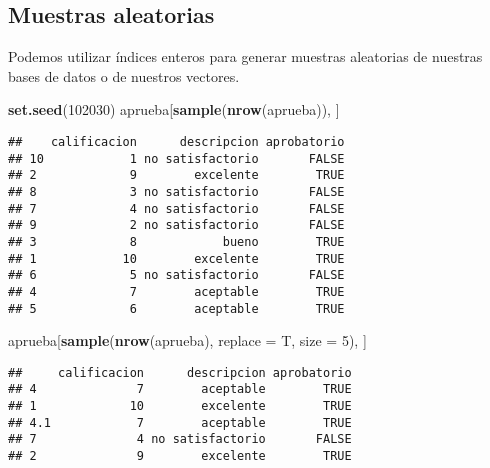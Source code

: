\documentclass[]{article}
\newenvironment{Shaded}{\begin{snugshade}}{\end{snugshade}}
\newcommand{\KeywordTok}[1]{\textcolor[rgb]{0.13,0.29,0.53}{\textbf{#1}}}
\newcommand{\DataTypeTok}[1]{\textcolor[rgb]{0.13,0.29,0.53}{#1}}
\newcommand{\DecValTok}[1]{\textcolor[rgb]{0.00,0.00,0.81}{#1}}
\newcommand{\NormalTok}[1]{#1}
\begin{document}
\subsection{Muestras aleatorias}\label{muestras-aleatorias}

Podemos utilizar índices enteros para generar muestras aleatorias de
nuestras bases de datos o de nuestros vectores.

\begin{Shaded}
\begin{Highlighting}[]
\KeywordTok{set.seed}\NormalTok{(}\DecValTok{102030}\NormalTok{)}
\NormalTok{aprueba[}\KeywordTok{sample}\NormalTok{(}\KeywordTok{nrow}\NormalTok{(aprueba)), ]}
\end{Highlighting}
\end{Shaded}

\begin{verbatim}
##    calificacion      descripcion aprobatorio
## 10            1 no satisfactorio       FALSE
## 2             9        excelente        TRUE
## 8             3 no satisfactorio       FALSE
## 7             4 no satisfactorio       FALSE
## 9             2 no satisfactorio       FALSE
## 3             8            bueno        TRUE
## 1            10        excelente        TRUE
## 6             5 no satisfactorio       FALSE
## 4             7        aceptable        TRUE
## 5             6        aceptable        TRUE
\end{verbatim}

\begin{Shaded}
\begin{Highlighting}[]
\NormalTok{aprueba[}\KeywordTok{sample}\NormalTok{(}\KeywordTok{nrow}\NormalTok{(aprueba), }\DataTypeTok{replace =}\NormalTok{ T, }\DataTypeTok{size =} \DecValTok{5}\NormalTok{), ]}
\end{Highlighting}
\end{Shaded}

\begin{verbatim}
##     calificacion      descripcion aprobatorio
## 4              7        aceptable        TRUE
## 1             10        excelente        TRUE
## 4.1            7        aceptable        TRUE
## 7              4 no satisfactorio       FALSE
## 2              9        excelente        TRUE
\end{verbatim}

\renewcommand\bcStyleTitre[1]{\large\textcolor{bbblack}{#1}}
\end{document}
